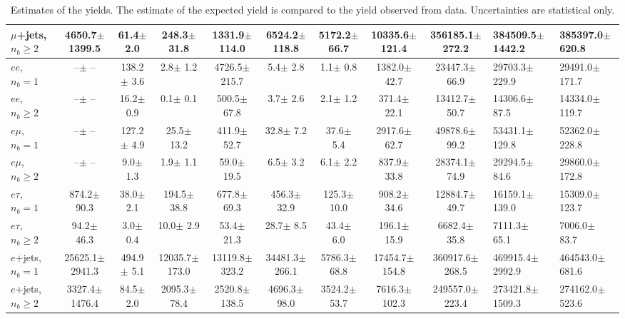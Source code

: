 \begin{sidewaystable}[p]
\begin{tabular}{l|cccccc|cc}
    $\mu$+jets, $n_b\geq2$             &   4650.7$\pm$ 1399.5 &     61.4$\pm$    2.0 &    248.3$\pm$   31.8 &   1331.9$\pm$  114.0 &   6524.2$\pm$  118.8 &   5172.2$\pm$   66.7 &  10335.6$\pm$  121.4 & 356185.1$\pm$  272.2 & 384509.5$\pm$ 1442.2 & 385397.0$\pm$  620.8 \\ 
    \hline
    $e e$, $n_b=1$                     &       --$\pm$     -- &    138.2$\pm$    3.6 &      2.8$\pm$    1.2 &   4726.5$\pm$  215.7 &      5.4$\pm$    2.8 &      1.1$\pm$    0.8 &   1382.0$\pm$   42.7 &  23447.3$\pm$   66.9 &  29703.3$\pm$  229.9 &  29491.0$\pm$  171.7 \\ 
    $e e$, $n_b\geq2$                  &       --$\pm$     -- &     16.2$\pm$    0.9 &      0.1$\pm$    0.1 &    500.5$\pm$   67.8 &      3.7$\pm$    2.6 &      2.1$\pm$    1.2 &    371.4$\pm$   22.1 &  13412.7$\pm$   50.7 &  14306.6$\pm$   87.5 &  14334.0$\pm$  119.7 \\ 
    \hline
    $e\mu$, $n_b=1$                    &       --$\pm$     -- &    127.2$\pm$    4.9 &     25.5$\pm$   13.2 &    411.9$\pm$   52.7 &     32.8$\pm$    7.2 &     37.6$\pm$    5.4 &   2917.6$\pm$   62.7 &  49878.6$\pm$   99.2 &  53431.1$\pm$  129.8 &  52362.0$\pm$  228.8 \\ 
    $e\mu$, $n_b\geq2$                 &       --$\pm$     -- &      9.0$\pm$    1.3 &      1.9$\pm$    1.1 &     59.0$\pm$   19.5 &      6.5$\pm$    3.2 &      6.1$\pm$    2.2 &    837.9$\pm$   33.8 &  28374.1$\pm$   74.9 &  29294.5$\pm$   84.6 &  29860.0$\pm$  172.8 \\ 
    \hline
    $e\tau$, $n_b=1$                   &    874.2$\pm$   90.3 &     38.0$\pm$    2.1 &    194.5$\pm$   38.8 &    677.8$\pm$   69.3 &    456.3$\pm$   32.9 &    125.3$\pm$   10.0 &    908.2$\pm$   34.6 &  12884.7$\pm$   49.7 &  16159.1$\pm$  139.0 &  15309.0$\pm$  123.7 \\ 
    $e\tau$, $n_b\geq2$                &     94.2$\pm$   46.3 &      3.0$\pm$    0.4 &     10.0$\pm$    2.9 &     53.4$\pm$   21.3 &     28.7$\pm$    8.5 &     43.4$\pm$    6.0 &    196.1$\pm$   15.9 &   6682.4$\pm$   35.8 &   7111.3$\pm$   65.1 &   7006.0$\pm$   83.7 \\ 
    \hline
    $e$+jets, $n_b=1$                  &  25625.1$\pm$ 2941.3 &    494.9$\pm$    5.1 &  12035.7$\pm$  173.0 &  13119.8$\pm$  323.2 &  34481.3$\pm$  266.1 &   5786.3$\pm$   68.8 &  17454.7$\pm$  154.8 & 360917.6$\pm$  268.5 & 469915.4$\pm$ 2992.9 & 464543.0$\pm$  681.6 \\ 
    $e$+jets, $n_b\geq2$               &   3327.4$\pm$ 1476.4 &     84.5$\pm$    2.0 &   2095.3$\pm$   78.4 &   2520.8$\pm$  138.5 &   4696.3$\pm$   98.0 &   3524.2$\pm$   53.7 &   7616.3$\pm$  102.3 & 249557.0$\pm$  223.4 & 273421.8$\pm$ 1509.3 & 274162.0$\pm$  523.6 \\ 
    \hline

    \end{tabular}
    \caption{Estimates of the yields. The estimate of the expected yield is compared to
    the yield observed from data.  Uncertainties are statistical only.
    \label{tab:yields}}
\end{sidewaystable}
